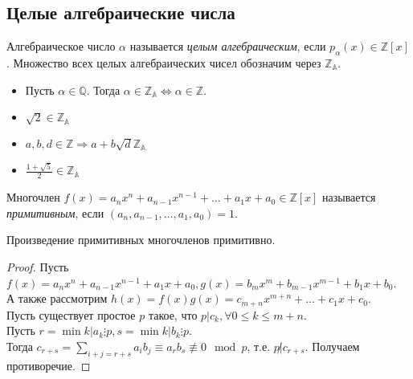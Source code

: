 \subsection{Целые алгебраические числа}

\begin{definition}
	Алгебраическое число $\alpha$ называется \textit{целым алгебраическим}, если $p_{\alpha}(x) \in \mathbb{Z}[x]$. Множество всех целых алгебраических чисел обозначим через $\mathbb{Z}_{\mathbb{A}}$.
\end{definition}

\begin{example}
	\begin{itemize}
		\item Пусть $\alpha \in \mathbb{Q}$. Тогда $\alpha \in \mathbb{Z_{\mathbb{A}}} \Leftrightarrow \alpha \in \mathbb{Z}$.
		\item $\sqrt{2} \in \mathbb{Z_{\mathbb{A}}}$
		\item $a, b, d \in \mathbb{Z} \Rightarrow a + b\sqrt{d} \mathbb{Z_{\mathbb{A}}}$
		\item $\frac{1 + \sqrt{5}}{2} \in \mathbb{Z_{\mathbb{A}}}$ 
	\end{itemize}
\end{example}

\begin{definition}
	Многочлен $f(x) = a_n x^n + a_{n - 1} x^{n - 1} + \ldots + a_1 x + a_0 \in \mathbb{Z}[x]$ называется \textit{примитивным}, если  $(a_n, a_{n - 1}, \ldots, a_1, a_0) = 1$.
\end{definition}

\begin{lemma}[Гаусса] \label{l11_Gauss_lemma}
	Произведение примитивных многочленов примитивно.
\end{lemma}
\begin{proof}
	Пусть $f(x) = a_n x^n + a_{n - 1}x^{n - 1} + a_1 x + a_0, g(x) = b_m x^m + b_{m - 1} x^{m - 1} + b_1 x + b_0$.\\
	А также рассмотрим $h(x) = f(x) g(x) = c_{m + n} x^{m + n} + \ldots + c_1 x + c_0$.\\
	Пусть существует простое $p$ такое, что $p | c_k, \forall 0 \leq k \leq m + n$.\\
	Пусть $r = \min{k | a_k \vdots p}, s = \min{k | b_k \vdots p}$.\\
	Тогда $\displaystyle c_{r + s } = \sum_{i + j = r + s} a_i b_j \equiv a_r b_s \not \equiv 0 \mod p$, т.е. $p \not | c_{r + s}$. Получаем противоречие.
\end{proof}

